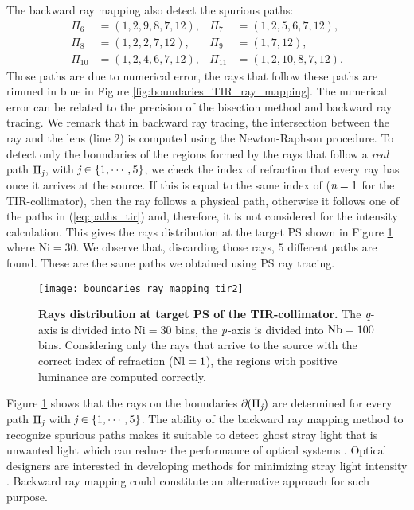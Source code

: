The backward ray mapping also detect the spurious paths:
\begin{equation}\label{eq:paths_tir}
\begin{array}{llll}
\Pi_6&=(1,2,9,8,7,12), & \Pi_7&=(1,2,5,6,7,12), \\
\Pi_8&=(1,2,2,7,12),& \Pi_9&=(1,7,12),\\
\Pi_{10}&=(1,2,4,6,7,12),& \Pi_{11}&=(1,2,10,8,7,12).
\end{array}\end{equation}
Those paths are due to numerical error, the rays that follow these paths are rimmed in blue in Figure \ref{fig:boundaries_TIR_ray_mapping}. The numerical error can be related to the precision of the bisection method and backward ray tracing. We remark that in backward ray tracing, the intersection between the ray and the lens (line $2$) is computed using the Newton-Raphson procedure.
To detect only the boundaries of the regions formed by the rays that follow a \textit{real} path $\Pi_{\textit{j}}$, with $\textit{j}\in\{1, \cdots, 5\}$, we check the index of refraction that every ray has once it arrives at the source.
If this is equal to the same index of  ($\textit{n}=1$ for the TIR-collimator), then the ray follows a physical path, otherwise it follows one of the paths in (\ref{eq:paths_tir}) and, therefore, it is not considered for the intensity calculation. This gives the rays distribution at the target PS shown in Figure \ref{fig:boundaries_TIR_ray_mapping1} where $\textrm{Ni}=30$. We observe that, discarding those rays, $5$ different paths are found. These are the same paths we obtained using PS ray tracing.
\begin{figure}[h]
  \begin{center}
  \texttt{[image: boundaries\_ray\_mapping\_tir2]}
  \end{center}
  \caption{\textbf{Rays distribution at target PS of the TIR-collimator.}
 The $\textit{q}$-axis is divided into $\textrm{Ni}=30$ bins, the $\textit{p}$-axis is divided into $\textrm{Nb} = 100$ bins. Considering only the rays that arrive to the source with the correct index of refraction ($\textrm{Nl}=1$), the regions with positive luminance are computed correctly.}
\label{fig:boundaries_TIR_ray_mapping1}
 \end{figure}
Figure \ref{fig:boundaries_TIR_ray_mapping1} shows that the rays on the boundaries $\partial$$(\Pi_{\textit{j}})$ are determined for every path $\Pi_{\textit{j}}$ with $\textit{j}\in\{1, \cdots, 5\}$. The ability of the backward ray mapping method to recognize spurious paths makes it suitable to detect ghost stray light that is unwanted light which can reduce the performance of optical systems \cite{breault1995control}. Optical designers are interested in developing methods for minimizing stray light intensity \cite{grabarnik2015optical}. Backward ray mapping could constitute an alternative approach for such purpose. 
